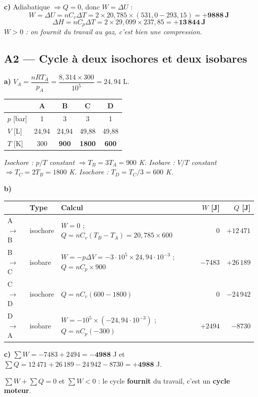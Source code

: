 \documentclass[11pt,a4paper]{article}
\begin{document}
\textbf{c)} Adiabatique $\Rightarrow \boxed{Q=0}$, donc $W=\Delta U$ :
\[W=\Delta U=nC_v\Delta T=2\times20{,}785\times(531{,}0-293{,}15)=\mathbf{+9888\ \text{J}}\]
\[\Delta H=nC_p\Delta T=2\times29{,}099\times237{,}85=\mathbf{+13\,844\ \text{J}}\]
\emph{$W>0$ : on fournit du travail au gaz, c'est bien une compression.}

\subsection{A2 --- Cycle à deux isochores et deux isobares}

\textbf{a)} $V_A=\dfrac{nRT_A}{p_A}=\dfrac{8{,}314\times300}{10^5}=24{,}94$ L.

\begin{center}\small
\renewcommand{\arraystretch}{1.3}
\begin{tabular}{@{}l cccc@{}}
\toprule
& \textbf{A} & \textbf{B} & \textbf{C} & \textbf{D}\\
\midrule
$p$ [bar] & 1 & 3 & 3 & 1\\
$V$ [L] & 24{,}94 & 24{,}94 & 49{,}88 & 49{,}88\\
$T$ [K] & 300 & \textbf{900} & \textbf{1800} & \textbf{600}\\
\bottomrule
\end{tabular}
\end{center}
\emph{Isochore : $p/T$ constant $\Rightarrow T_B=3T_A=900$ K. Isobare : $V/T$ constant
$\Rightarrow T_C=2T_B=1800$ K. Isochore : $T_D=T_C/3=600$ K.}

\textbf{b)}
\begin{center}\small
\renewcommand{\arraystretch}{1.4}
\begin{tabularx}{\linewidth}{@{}l l X r r@{}}
\toprule
& \textbf{Type} & \textbf{Calcul} & $W$ [J] & $Q$ [J]\\
\midrule
A$\to$B & isochore & $W=0$ ; $Q=nC_v(T_B{-}T_A)=20{,}785\times600$ & $0$ & $+12\,471$\\
B$\to$C & isobare & $W=-p\Delta V=-3\!\cdot\!10^5\times24{,}94\!\cdot\!10^{-3}$ ;
$Q=nC_p\times900$ & $-7483$ & $+26\,189$\\
C$\to$D & isochore & $Q=nC_v(600{-}1800)$ & $0$ & $-24\,942$\\
D$\to$A & isobare & $W=-10^5\times(-24{,}94\!\cdot\!10^{-3})$ ; $Q=nC_p(-300)$ & $+2494$ & $-8730$\\
\bottomrule
\end{tabularx}
\end{center}

\textbf{c)} $\sum W=-7483+2494=\mathbf{-4988}$ J et
$\sum Q=12\,471+26\,189-24\,942-8730=\mathbf{+4988}$ J.
\begin{verif}
$\sum W+\sum Q=0$ \checkmark \quad et $\sum W<0$ : le cycle \textbf{fournit} du travail,
c'est un \textbf{cycle moteur}. \checkmark
\end{verif}
\end{document}
